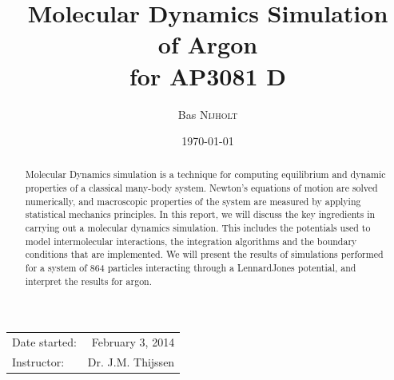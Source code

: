 \documentclass{article}
\title{Molecular Dynamics Simulation \\ of Argon \\ for AP3081 D} %
\author{Bas \textsc{Nijholt}} %
\date{\today} %
\begin{document}
\maketitle %

\begin{center}
\begin{tabular}{l r}
Date started: & February 3, 2014 \\ 
Instructor: & Dr. J.M. Thijssen
\end{tabular}
\end{center}

\begin{abstract}
Molecular Dynamics simulation is a technique for computing equilibrium and dynamic properties of a classical many-body system. Newton’s equations of motion are solved numerically, and macroscopic properties of the system are measured by applying statistical mechanics principles. In this report, we will discuss the key ingredients in carrying out a molecular dynamics simulation. This includes the potentials used to model intermolecular interactions, the integration algorithms and the boundary conditions that are implemented. We will present the results of simulations performed for a system of 864 particles interacting through a Lennard\text{-}Jones potential, and interpret the results for argon.
\end{abstract}

\end{document}
